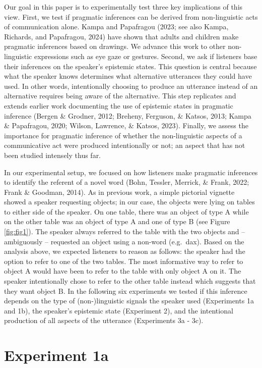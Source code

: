\documentclass[
  man,floatsintext]{apa6}
\begin{document}
Our goal in this paper is to experimentally test three key implications of this view. First, we test if pragmatic inferences can be derived from non-linguistic acts of communication alone. Kampa and Papafragou (2023; see also Kampa, Richards, and Papafragou, 2024) have shown that adults and children make pragmatic inferences based on drawings. We advance this work to other non-linguistic expressions such as eye gaze or gestures. Second, we ask if listeners base their inferences on the speaker's epistemic states. This question is central because what the speaker knows determines what alternative utterances they could have used. In other words, intentionally choosing to produce an utterance instead of an alternative requires being aware of the alternative. This step replicates and extends earlier work documenting the use of epistemic states in pragmatic inference (Bergen \& Grodner, 2012; Breheny, Ferguson, \& Katsos, 2013; Kampa \& Papafragou, 2020; Wilson, Lawrence, \& Katsos, 2023). Finally, we assess the importance for pragmatic inference of whether the non-linguistic aspects of a communicative act were produced intentionally or not; an aspect that has not been studied intensely thus far.

In our experimental setup, we focused on how listeners make pragmatic inferences to identify the referent of a novel word (Bohn, Tessler, Merrick, \& Frank, 2022; Frank \& Goodman, 2014). As in previous work, a simple pictorial vignette showed a speaker requesting objects; in our case, the objects were lying on tables to either side of the speaker. On one table, there was an object of type A while on the other table was an object of type A and one of type B (see Figure \ref{fig:fig1}). The speaker always referred to the table with the two objects and -- ambiguously -- requested an object using a non-word (e.g.~dax). Based on the analysis above, we expected listeners to reason as follows: the speaker had the option to refer to one of the two tables. The most informative way to refer to object A would have been to refer to the table with only object A on it. The speaker intentionally chose to refer to the other table instead which suggests that they want object B. In the following six experiments we tested if this inference depends on the type of (non-)linguistic signals the speaker used (Experiments 1a and 1b), the speaker's epistemic state (Experiment 2), and the intentional production of all aspects of the utterance (Experiments 3a - 3c).

\hypertarget{experiment-1a}{%
\section{Experiment 1a}\label{experiment-1a}}
\end{document}
